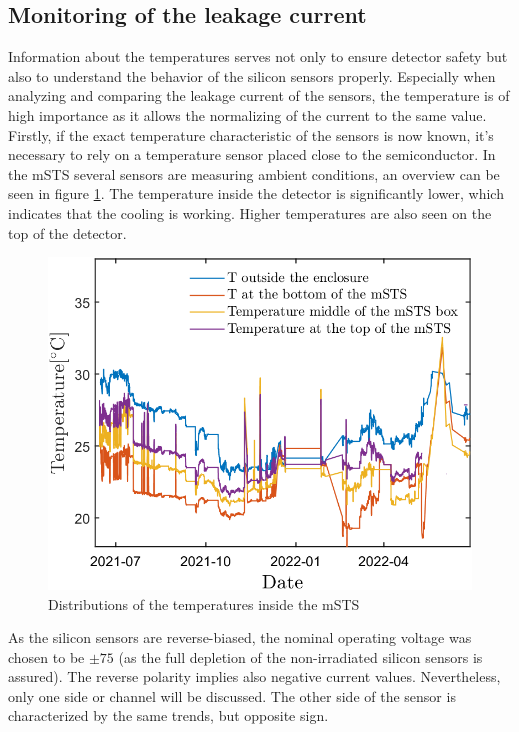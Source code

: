 \subsection{Monitoring of the leakage current}

Information about the temperatures serves not only to ensure detector safety but also to understand the behavior of the silicon sensors properly. Especially when analyzing and comparing the leakage current of the sensors, the temperature is of high importance as it allows the normalizing of the current to the same value. Firstly, if the exact temperature characteristic of the sensors is now known, it's necessary to rely on a temperature sensor placed close to the semiconductor. In the \gls{mSTS} several sensors are measuring ambient conditions, an overview can be seen in figure \ref{fig_temperatures}. The temperature inside the detector is significantly lower, which indicates that the cooling is working. Higher temperatures are also seen on the top of the detector. 

\newpage
\begin{figure}[!h]
\centering
\includegraphics[width=0.55\columnwidth]{Chapter6/DCS/images/rates/tempmSTS.png}
\caption{Distributions of the temperatures inside the \gls{mSTS}}
\label{fig_temperatures}
\end{figure}

As the silicon sensors are reverse-biased, the nominal operating voltage was chosen to be $\pm75$ (as the full depletion of the non-irradiated silicon sensors is assured). The reverse polarity implies also negative current values. Nevertheless, only one side or channel will be discussed. The other side of the sensor is characterized by the same trends, but opposite sign.

